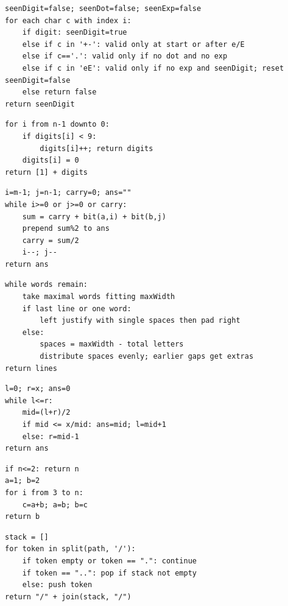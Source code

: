 \documentclass[11pt,a4paper]{ctexart}
\begin{document}
\begin{verbatim}
seenDigit=false; seenDot=false; seenExp=false
for each char c with index i:
    if digit: seenDigit=true
    else if c in '+-': valid only at start or after e/E
    else if c=='.': valid only if no dot and no exp
    else if c in 'eE': valid only if no exp and seenDigit; reset seenDigit=false
    else return false
return seenDigit
\end{verbatim}

\begin{verbatim}
for i from n-1 downto 0:
    if digits[i] < 9:
        digits[i]++; return digits
    digits[i] = 0
return [1] + digits
\end{verbatim}

\begin{verbatim}
i=m-1; j=n-1; carry=0; ans=""
while i>=0 or j>=0 or carry:
    sum = carry + bit(a,i) + bit(b,j)
    prepend sum%2 to ans
    carry = sum/2
    i--; j--
return ans
\end{verbatim}

\begin{verbatim}
while words remain:
    take maximal words fitting maxWidth
    if last line or one word:
        left justify with single spaces then pad right
    else:
        spaces = maxWidth - total letters
        distribute spaces evenly; earlier gaps get extras
return lines
\end{verbatim}

\begin{verbatim}
l=0; r=x; ans=0
while l<=r:
    mid=(l+r)/2
    if mid <= x/mid: ans=mid; l=mid+1
    else: r=mid-1
return ans
\end{verbatim}

\begin{verbatim}
if n<=2: return n
a=1; b=2
for i from 3 to n:
    c=a+b; a=b; b=c
return b
\end{verbatim}

\begin{verbatim}
stack = []
for token in split(path, '/'):
    if token empty or token == ".": continue
    if token == "..": pop if stack not empty
    else: push token
return "/" + join(stack, "/")
\end{verbatim}
\end{document}
